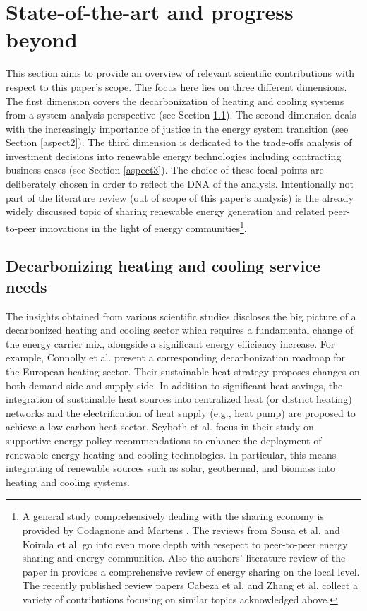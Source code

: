 \section{State-of-the-art and progress beyond}\label{stateoftheart}
This section aims to provide an overview of relevant scientific contributions with respect to this paper's scope. The focus here lies on three different dimensions. The first dimension covers the decarbonization of heating and cooling systems from a system analysis perspective (see Section \ref{aspect1}). The second dimension deals with the increasingly importance of justice in the energy system transition (see Section \ref{aspect2}). The third dimension is dedicated to the trade-offs analysis of investment decisions into renewable energy technologies including contracting business cases (see Section \ref{aspect3}). The choice of these focal points are deliberately chosen in order to reflect the DNA of the analysis. Intentionally not part of the literature review (out of scope of this paper's analysis) is the already widely discussed topic of sharing renewable energy generation and related peer-to-peer innovations in the light of energy communities\footnote{A general study comprehensively dealing with the sharing economy is provided by Codagnone and Martens \cite{codagnone2016scoping}. The reviews from Sousa et al. \cite{sousa2019peer} and Koirala et al. \cite{koirala2016energetic} go into even more depth with resepect to peer-to-peer energy sharing and energy communities. Also the authors' literature review of the paper in \cite{zwickl2021open} provides a comprehensive review of energy sharing on the local level. The recently published review papers Cabeza et al. \cite{cabeza2018integration} and Zhang et al. \cite{zhang2019review} collect a variety of contributions focusing on similar topics acknowledged above.}.

\subsection{Decarbonizing heating and cooling service needs}\label{aspect1}
The insights obtained from various scientific studies discloses the big picture of a decarbonized heating and cooling sector which requires a fundamental change of the energy carrier mix, alongside a significant energy efficiency increase. For example, Connolly et al. \cite{connolly2014heat} present a corresponding decarbonization roadmap for the European heating sector. Their sustainable heat strategy proposes changes on both demand-side and supply-side. In addition to significant heat savings, the integration of sustainable heat sources into centralized heat (or district heating) networks and the electrification of heat supply (e.g., heat pump) are proposed to achieve a low-carbon heat sector. Seyboth et al. \cite{seyboth2008recognising} focus in their study on supportive energy policy recommendations to enhance the deployment of renewable energy heating and cooling technologies. In particular, this means integrating of renewable sources such as solar, geothermal, and biomass into heating and cooling systems.\vspace{0.5cm}

